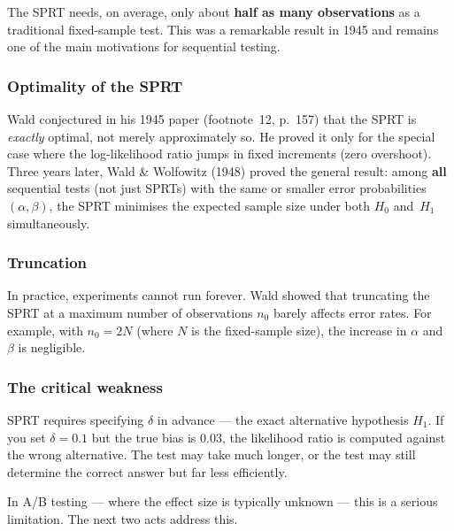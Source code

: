 \documentclass[12pt, a4paper]{article}
\begin{document}
\begin{plainlanguage}
The SPRT needs, on average, only about \textbf{half as many observations} as a
traditional fixed-sample test.  This was a remarkable result in 1945 and
remains one of the main motivations for sequential testing.
\end{plainlanguage}

\subsubsection*{Optimality of the SPRT}

\begin{historynote}
Wald conjectured in his 1945 paper (footnote~12, p.~157) that the SPRT is
\emph{exactly} optimal, not merely approximately so.  He proved it only for
the special case where the log-likelihood ratio jumps in fixed increments
(zero overshoot).  Three years later, Wald \& Wolfowitz
(1948) proved the general result: among \textbf{all} sequential tests
(not just SPRTs) with the same or smaller error probabilities $(\alpha, \beta)$,
the SPRT minimises the expected sample size under both $H_0$ and~$H_1$
simultaneously.
\end{historynote}

\subsubsection*{Truncation}

In practice, experiments cannot run forever.  Wald showed that truncating the
SPRT at a maximum number of observations $n_0$ barely affects error rates.
For example, with $n_0 = 2N$ (where $N$ is the fixed-sample size), the
increase in $\alpha$ and $\beta$ is negligible.

\subsubsection*{The critical weakness}

SPRT requires specifying $\delta$ in advance --- the exact alternative
hypothesis $H_1$.  If you set $\delta = 0.1$ but
the true bias is $0.03$, the likelihood ratio is computed against the wrong
alternative.  The test may take much longer, or the test may still determine
the correct answer but far less efficiently.

In A/B testing --- where the effect size is typically unknown --- this is a
serious limitation.  The next two acts address this.
\end{document}

